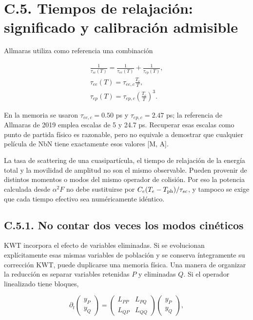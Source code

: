 \documentclass[
  spanish,
  10pt,
  a4paper,
]{article}
\begin{document}
\section{C.5. Tiempos de relajación: significado y calibración
admisible}\label{c.5.-tiempos-de-relajaciuxf3n-significado-y-calibraciuxf3n-admisible}

Allmaras utiliza como referencia una combinación

\[
\begin{gathered}
\frac1{\tau_{sc}(T)}=\frac1{\tau_{ee}(T)}+\frac1{\tau_{ep}(T)},\\
\tau_{ee}(T)=\tau_{ee,c}\frac{T_c}{T},\\
\tau_{ep}(T)=\tau_{ep,c}\left(\frac{T_c}{T}\right)^3.
\end{gathered} \tag{C.21}
\]

En la memoria se usaron \(\tau_{ee,c}=0.50\) ps y \(\tau_{ep,c}=2.47\)
ps; la referencia de Allmaras de 2019 emplea escalas de 5 y 24.7 ps.
Recuperar esas escalas como punto de partida físico es razonable, pero
no equivale a demostrar que cualquier película de NbN tiene exactamente
esos valores {[}M, A{]}.

La tasa de scattering de una cuasipartícula, el tiempo de relajación de
la energía total y la movilidad de amplitud no son el mismo observable.
Pueden provenir de distintos momentos o modos del mismo operador de
colisión. Por eso la potencia calculada desde \(\alpha^2F\) no debe
sustituirse por \(C_e(T_e-T_{\rm ph})/\tau_{sc}\), y tampoco se exige
que cada tiempo efectivo sea numéricamente idéntico.

\subsection{C.5.1. No contar dos veces los modos
cinéticos}\label{c.5.1.-no-contar-dos-veces-los-modos-cinuxe9ticos}

KWT incorpora el efecto de variables eliminadas. Si se evolucionan
explícitamente esas mismas variables de población y se conserva
íntegramente su corrección KWT, puede duplicarse una memoria física. Una
manera de organizar la reducción es separar variables retenidas \(P\) y
eliminadas \(Q\). Si el operador linealizado tiene bloques,

\[
\partial_t\begin{pmatrix}y_P\\y_Q\end{pmatrix}
=\begin{pmatrix}L_{PP}&L_{PQ}\\L_{QP}&L_{QQ}\end{pmatrix}
\begin{pmatrix}y_P\\y_Q\end{pmatrix},
\]
\end{document}
